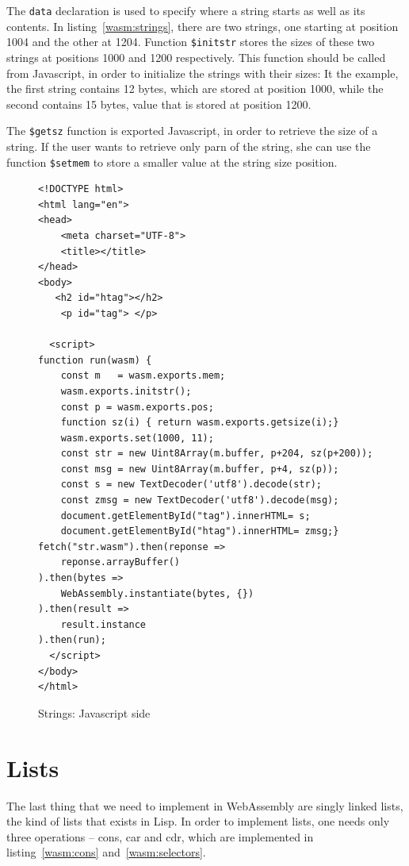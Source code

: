 \documentclass[a4paper,12pt]{book}
\begin{document}
The \verb|data| declaration is used to specify
where a string starts as well as its contents.
In listing~\ref{wasm:strings}, there are two
strings, one starting at position 1004 and the
other at 1204. Function \verb|$initstr| stores
the sizes of these two strings at positions 1000
and 1200 respectively. This function should be
called from Javascript, in order to initialize
the strings with their sizes: It the example,
the first string contains 12 bytes, which are
stored at position 1000, while the second contains
15 bytes, value that is stored at position 1200.

The \verb|$getsz| function is exported Javascript,
in order to retrieve the size of a string. If
the user wants to retrieve only parn of the string,
she can use the function \verb|$setmem| to store
a smaller value at the string size position.

\begin{figure}[!h]
  \begin{verbatim}
<!DOCTYPE html>
<html lang="en">
<head>
    <meta charset="UTF-8">
    <title></title>
</head>
<body>
   <h2 id="htag"></h2>
    <p id="tag"> </p>
  
  <script>
function run(wasm) {
    const m   = wasm.exports.mem;
    wasm.exports.initstr();
    const p = wasm.exports.pos;
    function sz(i) { return wasm.exports.getsize(i);}
    wasm.exports.set(1000, 11);
    const str = new Uint8Array(m.buffer, p+204, sz(p+200));
    const msg = new Uint8Array(m.buffer, p+4, sz(p));
    const s = new TextDecoder('utf8').decode(str);
    const zmsg = new TextDecoder('utf8').decode(msg);
    document.getElementById("tag").innerHTML= s;
    document.getElementById("htag").innerHTML= zmsg;}
fetch("str.wasm").then(reponse =>
    reponse.arrayBuffer()
).then(bytes =>
    WebAssembly.instantiate(bytes, {})
).then(result =>
    result.instance
).then(run);
  </script>
</body>
</html>
  \end{verbatim}
  \caption{Strings: Javascript side}
  \label{javascript:strings}
\end{figure}

\section{Lists}
The last thing that we need to implement in
WebAssembly are singly linked lists, the
kind of lists that exists in Lisp. In order
to implement lists, one needs only three
operations -- cons, car and cdr, which are
implemented in listing~\ref{wasm:cons}
and~\ref{wasm:selectors}.
\end{document}
